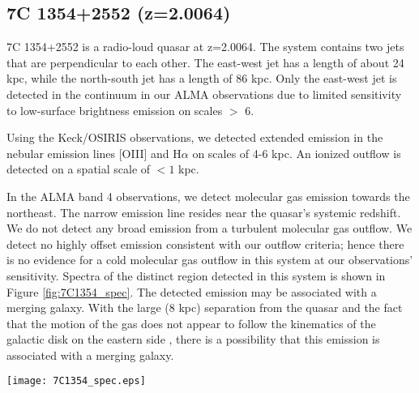 \documentclass[twocolumn]{aastex63}
\newcommand{\ha}{H$\alpha$\xspace}
\newcommand{\oiii}{[O{\sc III}]\xspace}
\newcommand{\kms}{km\,s$^{-1}$}
\begin{document}
\subsection{7C 1354+2552 (z=2.0064)}\label{sec:7C1354}

7C 1354+2552 is a radio-loud quasar at z=2.0064. The system contains two jets that are perpendicular to each other. The east-west jet has a length of about 24 kpc, while the north-south jet has a length of 86 kpc. Only the east-west jet is detected in the continuum in our ALMA observations due to limited sensitivity to low-surface brightness emission on scales $>$ 6\arcsec.

Using the Keck/OSIRIS observations, we detected extended emission in the nebular emission lines \oiii and \ha on scales of 4-6 kpc. An ionized outflow is detected on a spatial scale of $<1$ kpc. 

In the ALMA band 4 observations, we detect molecular gas emission towards the northeast. The narrow emission line resides near the quasar's systemic redshift. We do not detect any broad emission from a turbulent molecular gas outflow. We detect no highly offset emission consistent with our outflow criteria; hence there is no evidence for a cold molecular gas outflow in this system at our observations' sensitivity. Spectra of the distinct region detected in this system is shown in Figure \ref{fig:7C1354_spec}. The detected emission may be associated with a merging galaxy. With the large (8 kpc) separation from the quasar and the fact that the motion of the gas does not appear to follow the kinematics of the galactic disk on the eastern side \citep{Vayner19b}, there is a possibility that this emission is associated with a merging galaxy.


\begin{figure*}[!th]
    \centering
    \texttt{[image: 7C1354\_spec.eps]}
    \caption{ALMA band 4 observations of 7C 1354+2552. On the left we show optimally extracted intensity map of the molecular gas in the 7C 1354+2552 system, detected in the CO (4-3) line. The gas is narrow and is consistent with gravitational motion. Yellow contours outline the CO emitting region towards the north-west that is slightly redshifted, the spectrum associated with it is shown on right. The systemic redshift of the quasar host galaxy is at 0 \kms. The ellipse in the lower left corner on the right panel represents the beam of the ALMA band 4 observations.}
    \label{fig:7C1354_spec}
\end{figure*}
\end{document}

